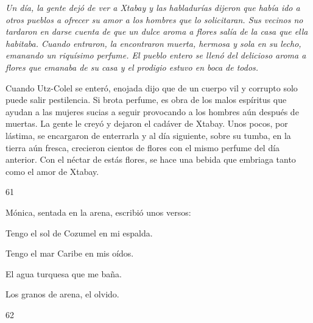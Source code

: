 \documentclass[12pt,twoside,openright,a5paper]{book}
\begin{document}
{\em Un día, la gente dejó de ver a Xtabay y las habladurías dijeron
que había ido a otros pueblos a ofrecer su amor a los hombres que lo
solicitaran. Sus vecinos no tardaron en darse cuenta de que un dulce aroma
a flores salía de la casa que ella habitaba. Cuando entraron, la encontraron
muerta, hermosa y sola en su lecho, emanando un riquísimo perfume. El pueblo
entero se llenó del delicioso aroma a flores que emanaba de su casa y el
prodigio estuvo en boca de todos.

Cuando Utz-Colel se enteró, enojada dijo que de un cuerpo vil y corrupto solo
puede salir pestilencia. Si brota perfume, es obra de los malos espíritus
que ayudan a las mujeres sucias a seguir provocando a los hombres aún
después de muertas. La gente le creyó y dejaron el cadáver de Xtabay. Unos
pocos, por lástima, se encargaron de enterrarla y al día siguiente,
sobre su tumba, en la tierra aún fresca, crecieron cientos de flores con
el mismo perfume del día anterior. Con el néctar de estás flores, se hace
una bebida que embriaga tanto como el amor de Xtabay.}

\vspace{0.5cm}

\hrulefill \hspace{0.1cm}\decofourleft\hspace{0.2cm} 61 \hspace{0.2cm}\decofourright \hspace{0.1cm}\hrulefill

\nopagebreak

\vspace{0.5cm}

\nopagebreak

Mónica, sentada en la arena, escribió unos versos: 

\vspace{0.5cm}

Tengo el sol de Cozumel en mi espalda.

Tengo el mar Caribe en mis oídos.

El agua turquesa que me baña.

Los granos de arena, el olvido.

\vspace{0.5cm}

\hrulefill \hspace{0.1cm}\decofourleft\hspace{0.2cm} 62 \hspace{0.2cm}\decofourright \hspace{0.1cm}\hrulefill
\end{document}
